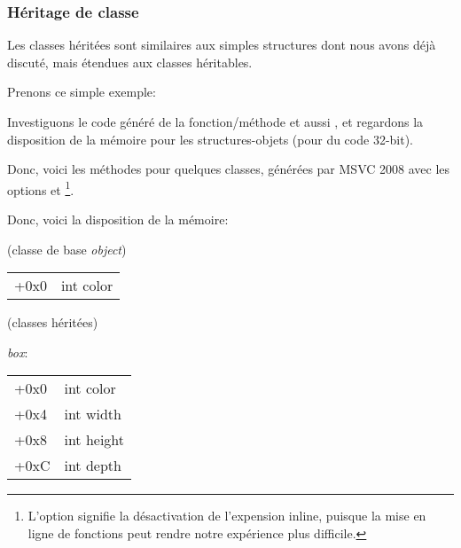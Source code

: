 \subsubsection{Héritage de classe}
\label{cpp_inheritance}


Les classes héritées sont similaires aux simples structures dont nous avons déjà
discuté, mais étendues aux classes héritables.

Prenons ce simple exemple:




Investiguons le code généré de la fonction/méthode  et aussi ,
et regardons la disposition de la mémoire pour les structures-objets (pour du code
32-bit).


Donc, voici les méthodes  pour quelques classes, générées par
MSVC 2008 avec les options \Ox et \Obzero
\footnote{L'option \Obzero signifie la désactivation de l'expension inline, puisque
la mise en ligne de fonctions peut rendre notre expérience plus difficile.}.







Donc, voici la disposition de la mémoire:

(classe de base \emph{object})

\begin{center}
\begin{tabular}{ | l | l | }
\hline
  \tableheader{} \\
\hline
  +0x0 & int color \\
\hline
\end{tabular}
\end{center}

(classes héritées)

\emph{box}:

\begin{center}
\begin{tabular}{ | l | l | }
\hline
  \tableheader{} \\
\hline
  +0x0 & int color \\
\hline
  +0x4 & int width \\
\hline
  +0x8 & int height \\
\hline
  +0xC & int depth \\
\hline
\end{tabular}
\end{center}

